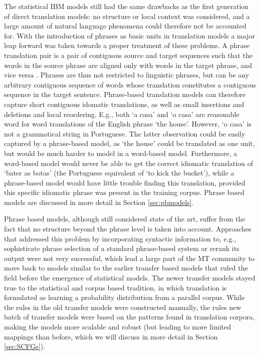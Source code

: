 The statistical IBM models still had the same drawbacks as the first generation of direct translation models: no structure or local context was considered, and a large amount of natural language phenomena could therefore not be accounted for. With the introduction of phrases as basic units in translation models \citep{wang1998grammar,och1999improved} a major leap forward was taken towards a proper treatment of these problems. A phrase translation pair is a pair of contiguous source and target sequences such that the words in the source phrase are aligned only with words in the target phrase, and vice versa \citep{och2000improved}. Phrases are thus not restricted to linguistic phrases, but can be any arbitrary contiguous sequence of words whose translation constitutes a contiguous sequence in the target sentence. Phrase-based translation models can therefore capture short contiguous idomatic translations, as well as small insertions and deletions and local reordering. E.g., both `a casa' and `o casa' are reasonable word for word translations of the English phrase `the house'. However, `o casa' is not a grammatical string in Portuguese. The latter observation could be easily captured by a phrase-based model, as `the house' could be translated as one unit, but would be much harder to model in a word-based model. Furthermore, a word-based model would never be able to get the correct idiomatic translation of `bater as botas' (the Portuguese equivalent of `to kick the bucket'), while a phrase-based model would have little trouble finding this translation, provided this specific idiomatic phrase was present in the training corpus. Phrase based models are discussed in more detail in Section \ref{sec:pbmodels}.

Phrase based models, although still considered state of the art, suffer from the fact that no structure beyond the phrase level is taken into account. Approaches that addressed this problem by incorporating syntactic information to, e.g., sophisticate phrase selection of a standard phrase-based system \citep{koehn2003statistical} or rerank its output \citep{och2004alignment} were not very successful, which lead a large part of the MT community to move back to models similar to the earlier transfer based models that ruled the field before the emergence of statistical models. The newer transfer models stayed true to the statistical and corpus based tradition, in which translation is formulated as learning a probability distribution from a parallel corpus. While the rules in the old transfer models were constructed manually, the rules new batch of transfer models were based on the patterns found in translation corpora, making the models more scalable and robust (but leading to more limited mappings than before, which we will discuss in more detail in Section \ref{sec:SCFGs}).


